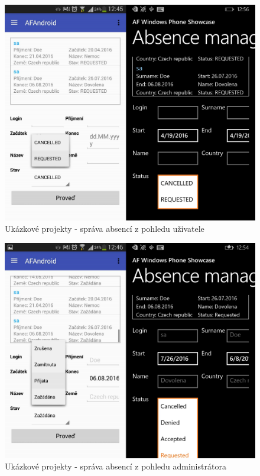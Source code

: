 \begin{figure}
\begin{center}
\includegraphics[width=\linewidth, height=\textheight, keepaspectratio]{figures/screenshots/AbsenceManagement}
\caption{Ukázkové projekty - správa absencí z pohledu uživatele}
\label{img:AbsenceManagement}
\end{center}
\end{figure}	

\begin{figure}
\begin{center}
\includegraphics[width=\linewidth, height=\textheight, keepaspectratio]{figures/screenshots/AbsenceManagementAdmin}
\caption{Ukázkové projekty - správa absencí z pohledu administrátora}
\label{img:AbsenceManagementAdmin}
\end{center}
\end{figure}	

